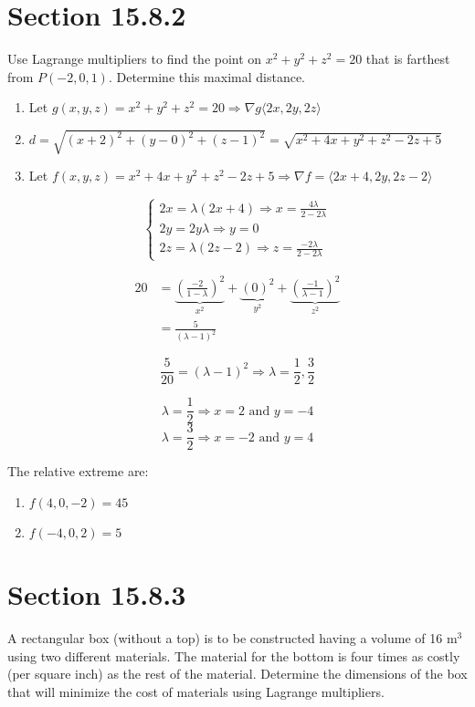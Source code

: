 \documentclass[letter,11pt]{article}
\begin{document}
\section*{Section 15.8.2}
Use Lagrange multipliers to find the point on $x^2 + y^2 + z^2 = 20$ that is farthest from $P (-2, 0, 1)$. Determine this maximal distance.
\begin{enumerate}[label=\roman*.]
    \item Let $g(x,y,z) = x^2 + y^2 + z^2 = 20 \Longrightarrow \nabla g \langle 2x,2y,2z\rangle$
    \item $d = \sqrt{(x+2)^2+(y-0)^2+(z-1)^2} = \sqrt{x^2+4x+y^2+z^2-2z+5}$
    \item Let $f(x,y,z) = x^2+4x+y^2+z^2-2z+5 \Longrightarrow \nabla f = \langle 2x+4,2y,2z-2\rangle$
\end{enumerate}

\[
\begin{cases}
    2x=\lambda(2x+4) \Longrightarrow x = \frac{4\lambda}{2-2\lambda}\\
    2y = 2y\lambda \Longrightarrow y = 0\\
    2z = \lambda(2z-2)\Longrightarrow z = \frac{-2\lambda}{2-2\lambda}
\end{cases}
\]

\begin{align*}
    20 &= \underbrace{\left(\frac{-2}{1-\lambda}\right)^2}_{x^2} + \underbrace{(0)^2}_{y^2} +\underbrace{\left(\frac{-1}{\lambda-1}\right)^2}_{z^2}\\
    &= \frac{5}{(\lambda-1)^2}
\end{align*}

$$\frac{5}{20} = (\lambda-1)^2 \Longrightarrow \lambda =  \frac{1}{2}, \frac{3}{2}$$

$$\lambda =  \frac{1}{2} \Longrightarrow x = 2 \text{ and } y= -4$$
$$\lambda =  \frac{3}{2} \Longrightarrow x = -2 \text{ and } y= 4$$


The relative extreme are:
\begin{enumerate}
    \item $f(4,0,-2)= 45$
    \item $f(-4,0,2) = 5$
\end{enumerate}

\section*{Section 15.8.3}
A rectangular box (without a top) is to be constructed having a volume of 16 m$^3$ using two different materials. The material for the bottom is four times as costly (per square inch) as the rest of the material. Determine the dimensions of the box that will minimize the cost of materials using Lagrange multipliers.
\end{document}
